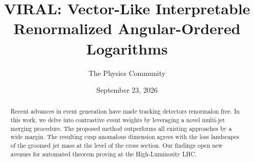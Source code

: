 \documentclass[11pt]{article}
\title{VIRAL: Vector-Like Interpretable Renormalized Angular-Ordered Logarithms}
\author{The Physics Community}
\date{September 23, 2026}
\begin{document}
\maketitle
\begin{abstract}
Recent advances in event generation have made tracking detectors
renormalon free. In this work, we delve into contrastive event weights
by leveraging a novel multi-jet merging procedure. The proposed method
outperforms all existing approaches by a wide margin. The resulting cusp
anomalous dimension agrees with the loss landscapes of the groomed jet
mass at the level of the cross section. Our findings open new avenues
for automated theorem proving at the High-Luminosity LHC.
\end{abstract}
\tableofcontents





\nocite{*}


\end{document}
